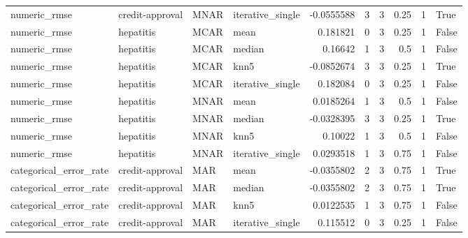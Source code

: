 \begin{table}[ht]
\begin{tabular}{llllrrrrrl}
 numeric\_rmse           & credit-approval & MNAR        & iterative\_single &     -0.0555588   &                   3 &       3 &      0.25 &        1 & True               \\
 numeric\_rmse           & hepatitis       & MCAR        & mean             &      0.181821    &                   0 &       3 &      0.25 &        1 & False              \\
 numeric\_rmse           & hepatitis       & MCAR        & median           &      0.16642     &                   1 &       3 &      0.5  &        1 & False              \\
 numeric\_rmse           & hepatitis       & MCAR        & knn5             &     -0.0852674   &                   3 &       3 &      0.25 &        1 & True               \\
 numeric\_rmse           & hepatitis       & MCAR        & iterative\_single &      0.182084    &                   0 &       3 &      0.25 &        1 & False              \\
 numeric\_rmse           & hepatitis       & MNAR        & mean             &      0.0185264   &                   1 &       3 &      0.5  &        1 & False              \\
 numeric\_rmse           & hepatitis       & MNAR        & median           &     -0.0328395   &                   3 &       3 &      0.25 &        1 & True               \\
 numeric\_rmse           & hepatitis       & MNAR        & knn5             &      0.10022     &                   1 &       3 &      0.5  &        1 & False              \\
 numeric\_rmse           & hepatitis       & MNAR        & iterative\_single &      0.0293518   &                   1 &       3 &      0.75 &        1 & False              \\
 categorical\_error\_rate & credit-approval & MAR         & mean             &     -0.0355802   &                   2 &       3 &      0.75 &        1 & True               \\
 categorical\_error\_rate & credit-approval & MAR         & median           &     -0.0355802   &                   2 &       3 &      0.75 &        1 & True               \\
 categorical\_error\_rate & credit-approval & MAR         & knn5             &      0.0122535   &                   1 &       3 &      0.75 &        1 & False              \\
 categorical\_error\_rate & credit-approval & MAR         & iterative\_single &      0.115512    &                   0 &       3 &      0.25 &        1 & False              \\

\end{tabular}
\end{table}
